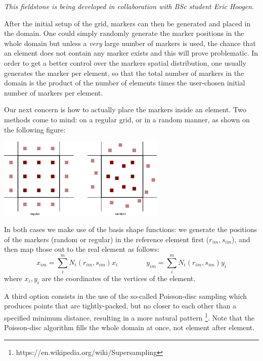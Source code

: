 {\sl This fieldstone is being developed in collaboration with BSc student Eric Hoogen}. 




After the initial setup of the grid, markers can then be generated and placed in the domain. One could simply randomly generate 
the marker positions in the whole domain but unless a {\it very} large number of markers is used, the chance that an element does 
not contain any marker exists and this will prove problematic. In order to get a better control over the markers spatial distribution, 
one usually generates the marker per element, so that the total number of markers in the domain is the product of the number of 
elements times the user-chosen initial number of markers per element. 

Our next concern is how to actually place the markers inside an element. Two methods come to mind: on a regular grid, or in a random manner, 
as shown on the following figure:

\begin{center}
\includegraphics[width=8cm]{python_codes/fieldstone_13/markers} 
\end{center}

In both cases we make use of the basis shape functions: we generate the positions of the markers (random or regular) in the reference
element first ($r_{im},s_{im}$), and then map those out to the real element as follows:
\begin{equation}
x_{im}=\sum_i^m N_i(r_{im},s_{im}) x_i
\quad\quad\quad\quad
y_{im}=\sum_i^m N_i(r_{im},s_{im}) y_i
\end{equation}
where $x_i,y_i$ are the coordinates of the vertices of the element.

A third option consists in the use of the so-called Poisson-disc sampling which 
produces points that are tightly-packed, but no closer to each other than 
a specified minimum distance, resulting in a more natural pattern 
\footnote{https://en.wikipedia.org/wiki/Supersampling}. Note that 
the Poisson-disc algorithm fills the whole domain at once, not element after element.

